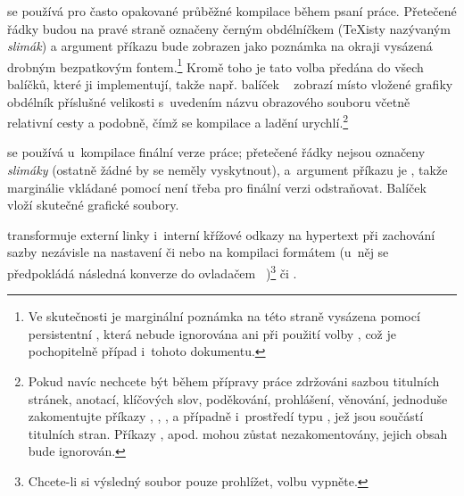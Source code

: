 \begin{description}
\label{opdraft} se používá pro často opakované průběžné
  kompilace během psaní práce. Přetečené řádky budou na pravé straně označeny
  černým obdélníčkem (\TeX isty nazývaným \emph{slimák}) a argument
  příkazu   bude zobrazen jako
  poznámka na okraji vysázená drobným bezpatkovým fontem.\footnote{Ve
    skutečnosti je marginální poznámka na této straně vysázena pomocí
    persistentní  , která
    nebude ignorována ani při použití volby , což je pochopitelně
    případ i~tohoto dokumentu.}  Kromě toho je tato volba předána do všech
  balíčků, které ji implementují, takže např.
  balíček ~\cite{Car:LIVE:CTAN:Graphics} zobrazí
  místo vložené grafiky obdélník příslušné velikosti s~uvedením názvu
  obrazového souboru včetně relativní cesty a podobně, čímž se kompilace a
  ladění urychlí.\footnote{Pokud navíc nechcete být během přípravy práce
    zdržováni sazbou titulních stránek, anotací, klíčových slov, poděkování,
    prohlášení, věnování, jednoduše zakomentujte příkazy , , ,  a případně i~prostředí
    typu , jež jsou součástí titulních stran. Příkazy
    ,  apod. mohou zůstat
    nezakomentovány, jejich obsah bude ignorován.}

\label{opfinal} se používá u~kompilace finální verze práce;
  přetečené řádky nejsou označeny \emph{slimáky} (ostatně žádné by se neměly
  vyskytnout), a~argument příkazu  je
  , takže marginálie vkládané pomocí 
  není třeba pro finální verzi odstraňovat. Balíček
  ~\cite{Car:LIVE:CTAN:Graphics} vloží skutečné grafické
  soubory.

\label{opthtext} transformuje externí linky i~interní křížové
  odkazy na hypertext při zachování sazby nezávisle na nastavení 
  či  nebo na kompilaci formátem  (u~něj se předpokládá
  následná konverze do  ovladačem
  ~\cite{Hir:LIVE:CTAN:dvipdfmx})\footnote{Chcete-li si výsledný
     soubor pouze prohlížet, volbu  vypněte.} či
  .


\end{description}

